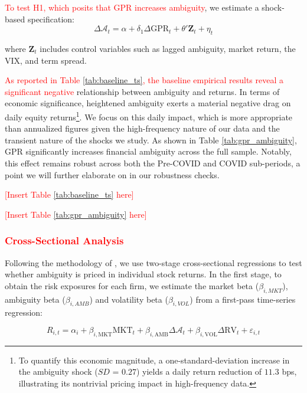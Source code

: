 \documentclass[preprint,12pt,authoryear]{elsarticle}
\begin{document}
\textcolor{red}{To test H1, which posits that GPR increases ambiguity}, we estimate a shock-based specification:
\begin{equation}
\Delta \mathcal{A}_{t} = \alpha + \delta_1 \Delta \text{GPR}_{t} + \theta' \mathbf{Z}_{t} + \eta_{t}
\end{equation}

where $\mathbf{Z}_t$ includes control variables such as lagged ambiguity, market return, the VIX, and term spread.

\textcolor{red}{As reported in Table \ref{tab:baseline_ts}, the baseline empirical results reveal a significant negative} relationship between ambiguity and returns. In terms of economic significance, heightened ambiguity exerts a material negative drag on daily equity returns\footnote{To quantify this economic magnitude, a one-standard-deviation increase in the ambiguity shock ($SD$ = $0.27$) yields a daily return reduction of $11.3$ bps, illustrating its nontrivial pricing impact in high-frequency data.}. We focus on this daily impact, which is more appropriate than annualized figures given the high-frequency nature of our data and the transient nature of the shocks we study. As shown in Table \ref{tab:gpr_ambiguity}, GPR significantly increases financial ambiguity across the full sample. Notably, this effect remains robust across both the Pre-COVID and COVID sub-periods, a point we will further elaborate on in our robustness checks.

\textcolor{red}{[Insert Table \ref{tab:baseline_ts} here]}

\textcolor{red}{[Insert Table \ref{tab:gpr_ambiguity} here]}

\subsubsection{\textcolor{red}{Cross-Sectional Analysis}}

Following the methodology of \citet{famaRiskReturnEquilibrium1973}, we use two-stage cross-sectional regressions to test whether ambiguity is priced in individual stock returns. In the first stage, to obtain the risk exposures for each firm, we estimate the market beta ($\beta_{i,MKT}$), ambiguity beta ($\beta_{i,AMB}$) and volatility beta ($\beta_{i,VOL}$) from a first-pass time-series regression:

\begin{equation}
R_{i,t} = \alpha_i + \beta_{i,\text{MKT}} \text{MKT}_t + \beta_{i,\text{AMB}} \Delta \mathcal{A}_t + \beta_{i,\text{VOL}} \Delta \text{RV}_t + \varepsilon_{i,t}
\end{equation}
\end{document}
